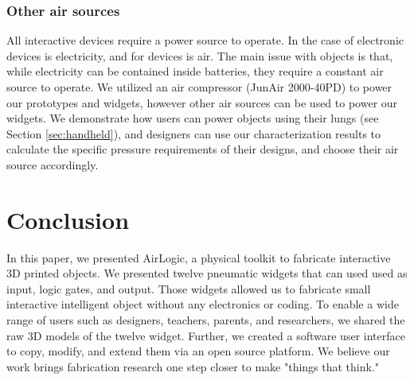       \subsubsection{Other air sources}
        All interactive devices require a power source to operate. In the
        case of electronic devices is electricity, and for \al devices is
        air. The main issue with \al objects is that, while electricity can
        be contained inside batteries, they require a constant air source
        to operate. We utilized an air compressor (JunAir 2000-40PD) to
        power our prototypes and widgets, however other air sources can be
        used to power our widgets. We demonstrate how users can power \al
        objects using their lungs (see Section \ref{sec:handheld}), and designers
        can use our characterization results to calculate the specific
        pressure requirements of their designs, and choose their air source
        accordingly.
        
  \section{Conclusion}
    In this paper, we presented AirLogic, a physical toolkit to fabricate
    interactive 3D printed objects. We presented twelve pneumatic widgets that
    can used used as input, logic gates, and output. Those widgets allowed us
    to fabricate small interactive intelligent object without any electronics
    or coding. To enable a wide range of users such as designers, teachers,
    parents, and researchers, we shared the raw 3D models of the twelve
    widget. Further, we created a software user interface to copy, modify, and
    extend them via an open source platform. We believe our work brings
    fabrication research one step closer to make "things that think."